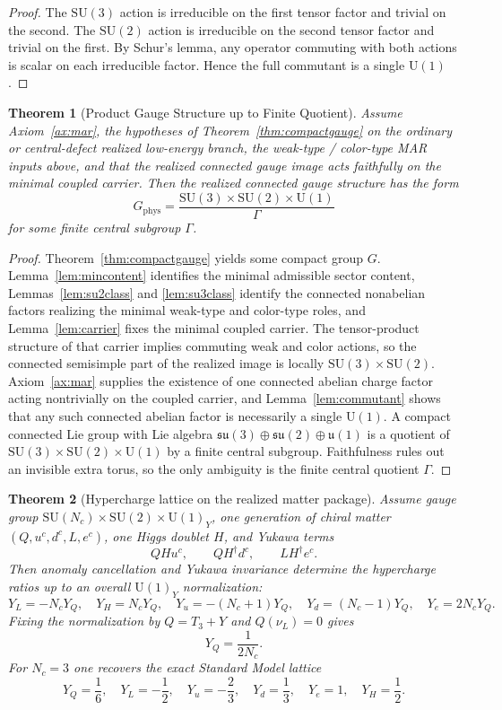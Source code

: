 \documentclass[11pt]{article}
\newtheorem{theorem}{Theorem}[section]
\newcommand{\SU}{\mathrm{SU}}
\newcommand{\U}{\mathrm{U}}
\begin{document}
\begin{proof}
The $\SU(3)$ action is irreducible on the first tensor factor and trivial on the second. The $\SU(2)$ action is irreducible on the second tensor factor and trivial on the first. By Schur's lemma, any operator commuting with both actions is scalar on each irreducible factor. Hence the full commutant is a single $\U(1)$.
\end{proof}

\begin{theorem}[Product Gauge Structure up to Finite Quotient]\label{thm:sm}
Assume Axiom~\ref{ax:mar}, the hypotheses of Theorem~\ref{thm:compactgauge} on the ordinary or central-defect realized low-energy branch, the weak-type / color-type MAR inputs above, and that the realized connected gauge image acts faithfully on the minimal coupled carrier. Then the realized connected gauge structure has the form
\[
G_{\mathrm{phys}}=
\frac{\SU(3)\times\SU(2)\times\U(1)}{\Gamma}
\]
for some finite central subgroup $\Gamma$.
\end{theorem}

\begin{proof}
Theorem~\ref{thm:compactgauge} yields some compact group $G$. Lemma~\ref{lem:mincontent} identifies the minimal admissible sector content, Lemmas~\ref{lem:su2class} and \ref{lem:su3class} identify the connected nonabelian factors realizing the minimal weak-type and color-type roles, and Lemma~\ref{lem:carrier} fixes the minimal coupled carrier. The tensor-product structure of that carrier implies commuting weak and color actions, so the connected semisimple part of the realized image is locally $\SU(3)\times\SU(2)$. Axiom~\ref{ax:mar} supplies the existence of one connected abelian charge factor acting nontrivially on the coupled carrier, and Lemma~\ref{lem:commutant} shows that any such connected abelian factor is necessarily a single $\U(1)$. A compact connected Lie group with Lie algebra $\mathfrak{su}(3)\oplus\mathfrak{su}(2)\oplus\mathfrak{u}(1)$ is a quotient of $\SU(3)\times\SU(2)\times\U(1)$ by a finite central subgroup. Faithfulness rules out an invisible extra torus, so the only ambiguity is the finite central quotient $\Gamma$.
\end{proof}

\begin{theorem}[Hypercharge lattice on the realized matter package]\label{thm:hypercharge}
Assume gauge group $\SU(N_c)\times\SU(2)\times\U(1)_Y$, one generation of chiral matter $(Q,u^c,d^c,L,e^c)$, one Higgs doublet $H$, and Yukawa terms
\[
QHu^c,\qquad QH^\dagger d^c,\qquad LH^\dagger e^c.
\]
Then anomaly cancellation and Yukawa invariance determine the hypercharge ratios up to an overall \(\U(1)_Y\) normalization:
\[
Y_L=-N_cY_Q,\quad
Y_H=N_cY_Q,\quad
Y_u=-(N_c+1)Y_Q,\quad
Y_d=(N_c-1)Y_Q,\quad
Y_e=2N_cY_Q.
\]
Fixing the normalization by $Q=T_3+Y$ and $Q(\nu_L)=0$ gives
\[
Y_Q=\frac{1}{2N_c}.
\]
For $N_c=3$ one recovers the exact Standard Model lattice
\[
Y_Q=\frac16,\quad
Y_L=-\frac12,\quad
Y_u=-\frac23,\quad
Y_d=\frac13,\quad
Y_e=1,\quad
Y_H=\frac12.
\]
\end{theorem}
\end{document}
